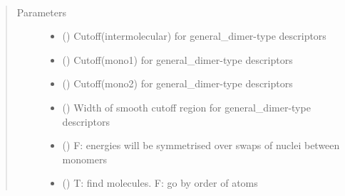 \documentclass[letterpaper,10pt,english]{sphinxmanual}
\begin{document}

\begin{fulllineitems}
\label{\detokenize{descriptors:gap.descriptors.general_dimer}}~\begin{quote}\begin{description}
\item[{Parameters}] \leavevmode\begin{itemize}
\item {} 
 () \textendash{} Cutoff(intermolecular) for general\_dimer-type descriptors

\item {} 
 () \textendash{} Cutoff(mono1) for general\_dimer-type descriptors

\item {} 
 () \textendash{} Cutoff(mono2) for general\_dimer-type descriptors

\item {} 
 () \textendash{} Width of smooth cutoff region for general\_dimer-type descriptors

\item {} 
 () \textendash{} F: energies will be symmetrised over swaps of nuclei between monomers

\item {} 
 () \textendash{} T: find molecules. F: go by order of atoms


\end{itemize}
\end{description}
\end{quote}
\end{fulllineitems}
\end{document}
